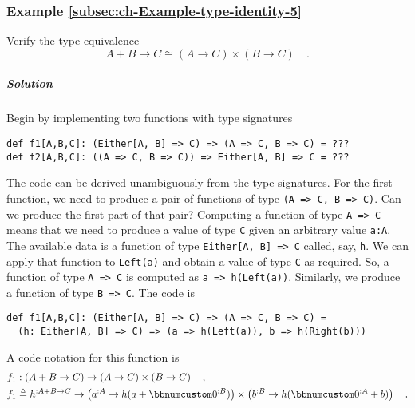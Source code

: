 \subsubsection{Example \label{subsec:ch-Example-type-identity-5}\ref{subsec:ch-Example-type-identity-5}}

Verify the type equivalence 
\[
A+B\rightarrow C\cong(A\rightarrow C)\times(B\rightarrow C)\quad.
\]


\subparagraph{Solution}

Begin by implementing two functions with type signatures
\begin{lstlisting}
def f1[A,B,C]: (Either[A, B] => C) => (A => C, B => C) = ???
def f2[A,B,C]: ((A => C, B => C)) => Either[A, B] => C = ???
\end{lstlisting}
The code can be derived unambiguously from the type signatures. For
the first function, we need to produce a pair of functions of type
\lstinline!(A => C, B => C)!. Can we produce the first part of that
pair? Computing a function of type \lstinline!A => C! means that
we need to produce a value of type \lstinline!C! given an arbitrary
value \lstinline!a:A!. The available data is a function of type \lstinline!Either[A, B] => C!
called, say, \lstinline!h!. We can apply that function to \lstinline!Left(a)!
and obtain a value of type \lstinline!C! as required. So, a function
of type \lstinline!A => C! is computed as \lstinline!a => h(Left(a))!.
Similarly, we produce a function of type \lstinline!B => C!. The
code is
\begin{lstlisting}
def f1[A,B,C]: (Either[A, B] => C) => (A => C, B => C) =
  (h: Either[A, B] => C) => (a => h(Left(a)), b => h(Right(b)))
\end{lstlisting}
A code notation for this function is
\begin{align*}
 & f_{1}:\left(A+B\rightarrow C\right)\rightarrow\left(A\rightarrow C\right)\times\left(B\rightarrow C\right)\quad,\\
 & f_{1}\triangleq h^{:A+B\rightarrow C}\rightarrow\left(a^{:A}\rightarrow h(a+\bbnum 0^{:B})\right)\times\left(b^{:B}\rightarrow h(\bbnum 0^{:A}+b)\right)\quad.
\end{align*}

